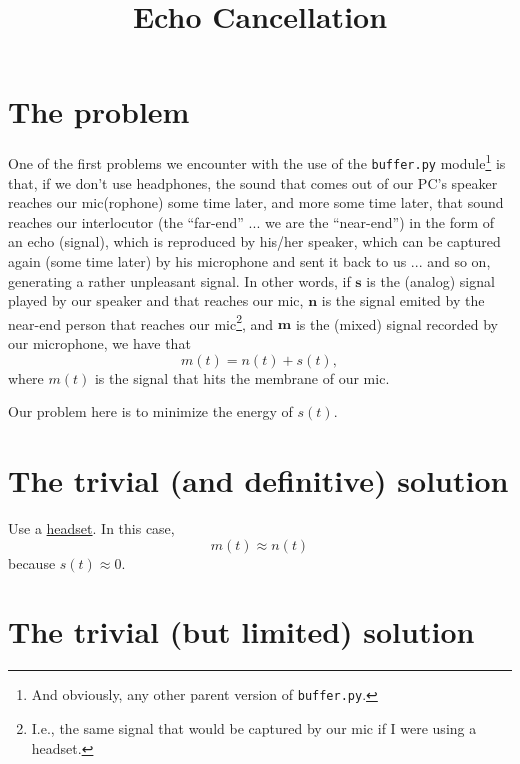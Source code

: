 
\title{Echo Cancellation}

\maketitle

\section{The problem}

One of the first problems we encounter with the use of the
\texttt{buffer.py} module\footnote{And obviously, any other parent
  version of \texttt{buffer.py}.} is that, if we don't use headphones,
the sound that comes out of our PC's speaker reaches our mic(rophone)
some time later, and more some time later, that sound reaches our
interlocutor (the ``far-end'' ... we are the ``near-end'') in the form
of an echo (signal), which is reproduced by his/her speaker, which can
be captured again (some time later) by his microphone and sent it back
to us ... and so on, generating a rather unpleasant signal. In other
words, if ${\mathbf s}$ is the (analog) signal played by our speaker
and that reaches our mic, ${\mathbf n}$ is the signal emited by the
near-end person that reaches our mic\footnote{I.e., the same signal
  that would be captured by our mic if I were using a headset.}, and
${\mathbf m}$ is the (mixed) signal recorded by our microphone, we
have that
\begin{equation}
  m(t) = n(t) + s(t),
  \label{eq:echo_problem}
\end{equation}
where $m(t)$ is the signal that hits the membrane of our mic.

Our problem here is to minimize the energy of $s(t)$.

\section{The trivial (and definitive) solution}

Use a \href{https://en.wikipedia.org/wiki/Audio_headset}{headset}. In
this case,
\begin{equation}
  m(t) \approx n(t)
  \label{eq:headset_solution}
\end{equation}
because $s(t)\approx 0$.

\section{The trivial (but limited) solution}

